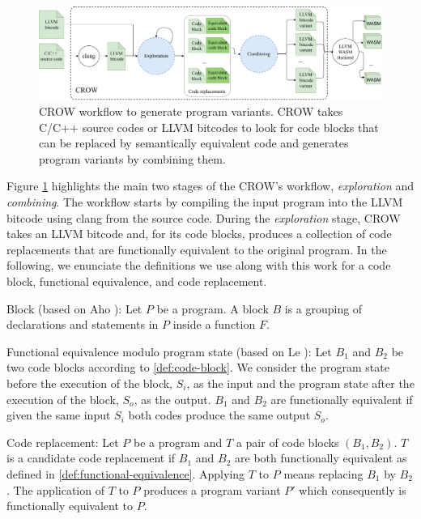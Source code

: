 \begin{figure}[h]
    \includegraphics[width=\linewidth]{diagrams/generation/crow.drawio.pdf}
    \caption{CROW workflow to generate program variants. CROW takes C/C++ source codes or LLVM bitcodes to look for code blocks that can be replaced by semantically equivalent code and generates program variants by combining them.}
    \label{diagrams:crow}
\end{figure}

Figure \ref{diagrams:crow} highlights the main two stages of the CROW's workflow, \textit{exploration} and \textit{combining}. The workflow starts by compiling the input program into the LLVM bitcode using clang from the source code. During the \emph{exploration} stage, CROW takes an LLVM bitcode and, for its code blocks, produces a collection of code replacements that are functionally equivalent to the original program. In the following, we enunciate the definitions we use along with this work for a code block, functional equivalence, and code replacement. 


\begin{definition}{Block (based on Aho \etal \cite{10.5555/6448}):}\label{def:code-block}
    Let $P$ be a program. A block $B$ is a grouping of declarations and statements in $P$ inside a function $F$. 
\end{definition}


\begin{definition}{Functional equivalence modulo program state (based on Le \etal \cite{10.1145/2594291.2594334}):}
    \label{def:functional-equivalence}
    Let $B_1$ and $B_2$ be two code blocks according to \autoref{def:code-block}. We consider the program state before the execution of the block, $S_i$, as the input and the program state after the execution of the block, $S_o$, as the output. $B_1$ and $B_2$ are functionally equivalent if given the same input $S_i$ both codes produce the same output $S_o$.
\end{definition}

\begin{definition}{Code replacement:}
    \label{def:code-replacement}
    Let $P$ be a program and $T$ a pair of code blocks $(B_1, B_2)$. $T$ is a candidate code replacement if $B_1$ and $B_2$ are both functionally equivalent as defined in \autoref{def:functional-equivalence}.
    Applying $T$ to $P$ means replacing $B_1$ by $B_2$. The application of $T$ to $P$ produces a program variant $P'$ which consequently is functionally equivalent to $P$.     
\end{definition}

